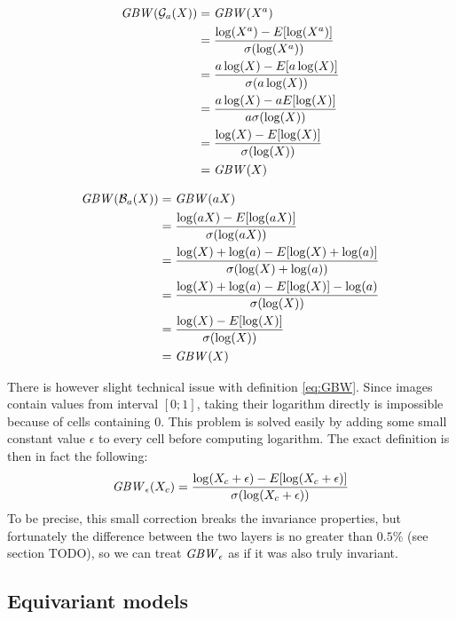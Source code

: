 \begin{align*}
    \mathit{GBW}(\mathcal{G}_a(X)) &=
    \mathit{GBW}(X^a) \\
    &= \frac{\log(X^a)-E[\log(X^a)]}{\sigma(\log(X^a))} \\
    &= \frac{a\log(X)-E[a\log(X)]}{\sigma(a\log(X))} \\
    &= \frac{a\log(X)-aE[\log(X)]}{a\sigma(\log(X))} \\
    &= \frac{\log(X)-E[\log(X)]}{\sigma(\log(X))} \\
    &= \mathit{GBW}(X)
\end{align*}

\begin{align*}
    \mathit{GBW}(\mathcal{B}_a(X)) &=
    \mathit{GBW}(aX) \\
    &= \frac{\log(aX)-E[\log(aX)]}{\sigma(\log(aX))} \\
    &= \frac{\log(X)+\log(a)-E[\log(X)+\log(a)]}{\sigma(\log(X)+\log(a))} \\
    &= \frac{\log(X)+\log(a)-E[\log(X)]-\log(a)}{\sigma(\log(X))} \\
    &= \frac{\log(X)-E[\log(X)]}{\sigma(\log(X))} \\
    &= \mathit{GBW}(X)
\end{align*}

There is however slight technical issue with definition \ref{eq:GBW}.
Since images contain values from interval $[0;1]$,
taking their logarithm directly is impossible because of
cells containing $0$. This problem is solved easily by adding some small constant value
$\epsilon$ to every cell before computing logarithm. The exact definition
is then in fact the following:
\begin{equation}
\mathit{GBW}_{\epsilon}(X_c) =
    \frac{\log(X_c+\epsilon)-E[\log(X_c+\epsilon)]}{\sigma(\log(X_c+\epsilon))}
\end{equation}
To be precise, this small correction breaks the invariance properties,
but fortunately the difference between the two layers is no
greater than $0.5\%$ (see section TODO), so we
can treat $\mathit{GBW}_{\epsilon}$ as if it was also truly invariant.



\subsection{Equivariant models}
\label{sec:equ_models}

